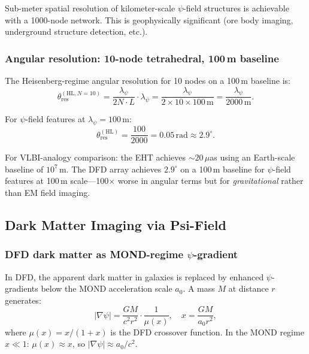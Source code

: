 \documentclass[11pt]{article}
\theoremstyle{definition}
\theoremstyle{remark}
\newcommand{\HL}{\mathrm{HL}}
\begin{document}
Sub-meter spatial resolution of kilometer-scale $\psi$-field structures
is achievable with a 1000-node network. This is geophysically significant
(ore body imaging, underground structure detection, etc.).

\subsubsection{Angular resolution: 10-node tetrahedral, 100\,m baseline}

The Heisenberg-regime angular resolution for 10 nodes on a 100\,m
baseline is:
\begin{equation}
\theta_{\mathrm{res}}^{(\HL, N=10)} = \frac{\lambda_\psi}{2N \cdot L}
\cdot \lambda_\psi = \frac{\lambda_\psi}{2 \times 10 \times 100\,\mathrm{m}}
= \frac{\lambda_\psi}{2000\,\mathrm{m}}.
\end{equation}

For $\psi$-field features at $\lambda_\psi = 100$\,m:
\begin{equation}
\theta_{\mathrm{res}}^{(\HL)} = \frac{100}{2000} = 0.05\,\mathrm{rad} \approx 2.9^\circ.
\end{equation}

For VLBI-analogy comparison: the EHT achieves $\sim 20\,\mu$as using
an Earth-scale baseline of $10^7$\,m. The DFD array achieves $2.9^\circ$
on a 100\,m baseline for $\psi$-field features at 100\,m scale---100$\times$
worse in angular terms but for \emph{gravitational} rather than EM field
imaging.

\subsection{Dark Matter Imaging via Psi-Field}

\subsubsection{DFD dark matter as MOND-regime $\psi$-gradient}

In DFD, the apparent dark matter in galaxies is replaced by enhanced
$\psi$-gradients below the MOND acceleration scale $a_0$. A mass $M$ at
distance $r$ generates:
\begin{equation}
|\nabla\psi| = \frac{GM}{c^2 r^2} \cdot \frac{1}{\mu(x)}, \quad
x = \frac{GM}{a_0 r^2},
\end{equation}
where $\mu(x) = x/(1+x)$ is the DFD crossover function. In the MOND
regime $x \ll 1$: $\mu(x) \approx x$, so $|\nabla\psi| \approx a_0/c^2$.
\end{document}
